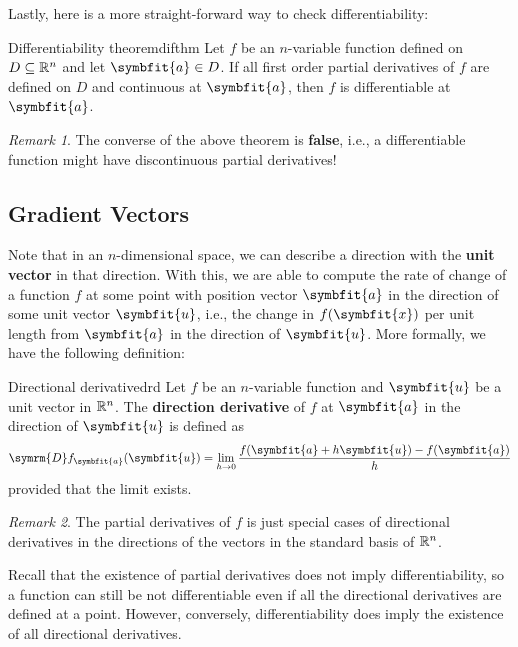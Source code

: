\documentclass[math]{amznotes}
\theoremstyle{remark}
\newtheorem*{remark}{Remark}
\begin{document}
Lastly, here is a more straight-forward way to check differentiability:
\begin{thmbox}{Differentiability theorem}{difthm}
    Let $f$ be an $n$-variable function defined on $D \subseteq \mathbb{R}^n$ and let $\symbfit{a} \in D$. If all first order partial derivatives of $f$ are defined on $D$ and continuous at $\symbfit{a}$, then $f$ is differentiable at $\symbfit{a}$.
\end{thmbox}
\begin{notebox}
    \begin{remark}
        The converse of the above theorem is {\color{red} \textbf{false}}, i.e., a differentiable function might have discontinuous partial derivatives!
    \end{remark}
\end{notebox}
\subsection{Gradient Vectors}
Note that in an $n$-dimensional space, we can describe a direction with the {\color{red} \textbf{unit vector}} in that direction. With this, we are able to compute the rate of change of a function $f$ at some point with position vector $\symbfit{a}$ in the direction of some unit vector $\symbfit{u}$, i.e., the change in $f(\symbfit{x})$ per unit length from $\symbfit{a}$ in the direction of $\symbfit{u}$. More formally, we have the following definition:
\begin{dfnbox}{Directional derivative}{drd}
    Let $f$ be an $n$-variable function and $\symbfit{u}$ be a unit vector in $\mathbb{R}^n$. The {\color{red} \textbf{direction derivative}} of $f$ at $\symbfit{a}$ in the direction of $\symbfit{u}$ is defined as
    \begin{equation*}
        \symrm{D}f_{\symbfit{a}}(\symbfit{u}) = \lim_{h \to 0}\frac{f(\symbfit{a} + h \symbfit{u}) - f(\symbfit{a})}{h}
    \end{equation*}
    provided that the limit exists.
\end{dfnbox}
\begin{notebox}
    \begin{remark}
        The partial derivatives of $f$ is just special cases of directional derivatives in the directions of the vectors in the standard basis of $\mathbb{R}^n$.
    \end{remark}
\end{notebox}
Recall that the existence of partial derivatives does not imply differentiability, so a function can still be not differentiable even if all the directional derivatives are defined at a point. However, conversely, differentiability does imply the existence of all directional derivatives.
\end{document}
